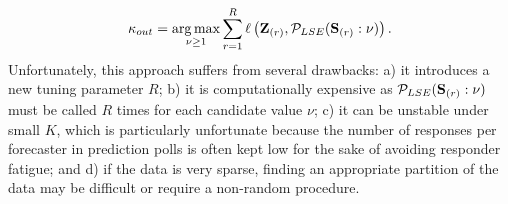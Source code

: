 \documentclass[11pt]{article}
\DeclareMathOperator*{\argmax}{arg\,max}
\theoremstyle{definition}
\theoremstyle{definition}
\def\Z{{\bf Z}}
\def\SS{{\bf S}}
\begin{document}
 \begin{align}
\kappa_{out} = \argmax_{\nu \geq 1} \sum_{r=1}^R \ell\left( \Z_{(r)}, \mathcal{P}_{LSE}(\SS_{(r)} : \nu)\right).
\label{kappa_out}
\end{align}
Unfortunately, this approach suffers from several drawbacks: a) it introduces a new tuning parameter $R$; b) it is computationally expensive as $\mathcal{P}_{LSE}(\SS_{(r)} : \nu)$ must be called $R$ times for each candidate value $\nu$; c) it can be unstable under small $K$, which is particularly unfortunate because
 the number of responses per forecaster in prediction polls is often kept low for the sake of avoiding responder fatigue; and d) if the data is very sparse, finding an appropriate partition of the data may be difficult or require a non-random procedure. 


\end{document}

